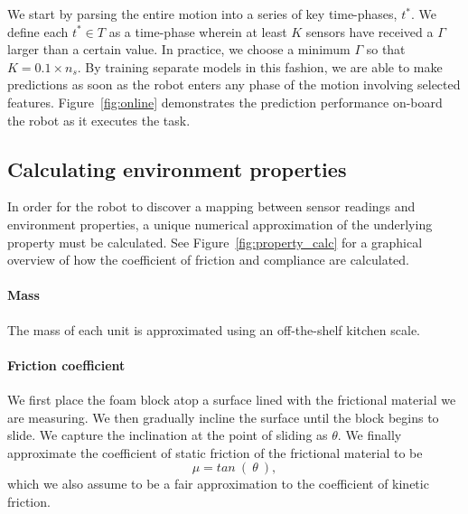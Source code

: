 We start by parsing the entire motion into a series of key time-phases, $t^*$.
We define each $t^* \in T$ as a time-phase wherein at least $K$ sensors have received a $\Gamma$ larger than a certain value.
In practice, we choose a minimum $\Gamma$ so that $K=0.1 \times n_s$.
By training separate models in this fashion, we are able to make predictions as soon as the robot enters any phase of the motion involving selected features.
Figure~\ref{fig:online} demonstrates the prediction performance on-board the robot as it executes the task.

\subsection{Calculating environment properties}
\label{sec:property_calc_}
In order for the robot to discover a mapping between sensor readings and environment properties, a unique numerical approximation of the underlying property must be calculated.
See Figure~\ref{fig:property_calc} for a graphical overview of how the coefficient of friction and compliance are calculated.

\paragraph{Mass} 
The mass of each unit is approximated using an off-the-shelf kitchen scale.

\paragraph{Friction coefficient}
We first place the foam block atop a surface lined with the frictional material we are measuring. 
We then gradually incline the surface until the block begins to slide.
We capture the inclination at the point of sliding as $\theta$.
We finally approximate the coefficient of static friction of the frictional material to be 
$$
\mu = tan~(~\theta~), 
$$
which we also assume to be a fair approximation to the coefficient of kinetic friction.

